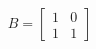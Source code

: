 \documentclass[preview]{standalone}
\begin{document}
\begin{align*}
B = \begin{bmatrix} 1 & 0 \\ 1 & 1 \end{bmatrix}
\end{align*}
\end{document}
